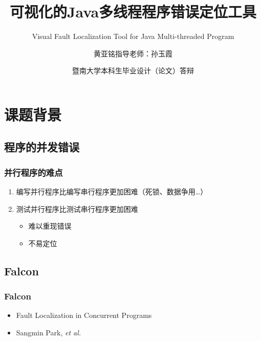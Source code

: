 ﻿\documentclass[12pt,serif,hyperref={CJKbookmarks=true}]{beamer}
\begin{document}
  \kaishu
  \title[2013.5.17]{可视化的Java多线程程序错误定位工具}
  \subtitle{Visual Fault Localization Tool for Java Multi-threaded Program}
  \author{黄亚铭\quad 指导老师：孙玉霞}
  \date[毕业论文答辩]{暨南大学本科生毕业设计（论文）答辩}


  \begin{frame}
    \titlepage
  \end{frame}


  \section{课题背景}
  \subsection{程序的并发错误}
  \begin{frame}
    \frametitle{并行程序的难点}
    \begin{enumerate}
      \item 编写并行程序比编写串行程序更加困难（死锁、数据争用\ldots）
      \pause
      \item 测试并行程序比测试串行程序更加困难
      \begin{itemize}
        \item 难以重现错误
        \item 不易定位
      \end{itemize}
    \end{enumerate}
  \end{frame}

  \subsection{Falcon}
  \begin{frame}
    \frametitle{Falcon}
    \begin{itemize}
      \item Fault Localization in Concurrent Programs
      \item Sangmin Park, \textit{et al.}
    \end{itemize}
  \end{frame}
\end{document}
